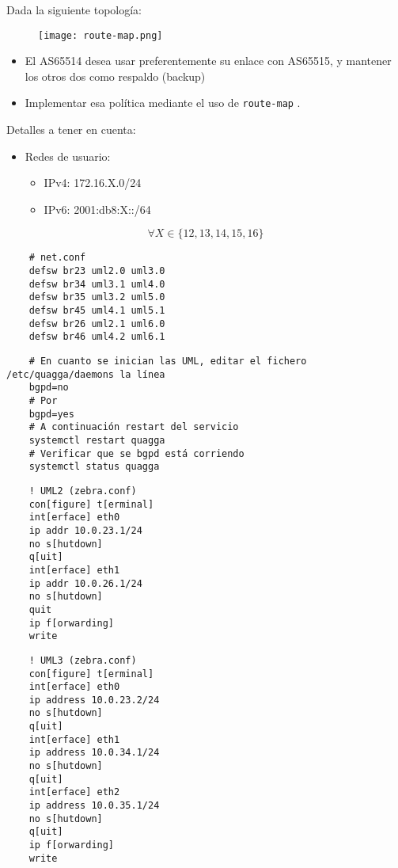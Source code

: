 Dada la siguiente topología:
  \begin{figure}[h]
    \texttt{[image: route-map.png]}
  \end{figure}

  \begin{itemize}
    \item El AS65514 desea usar preferentemente su enlace con AS65515,
    y mantener los otros dos como respaldo (backup)
    \item Implementar esa política mediante el uso de \texttt{route-map} .
  \end{itemize}

  Detalles a tener en cuenta:

  \begin{itemize}
    \item Redes de usuario:
    \begin{itemize}
      \item IPv4: 172.16.X.0/24
      \item IPv6: 2001:db8:X::/64
    \end{itemize}
  \end{itemize}

  \[ \forall X \in \{12,13,14,15,16\} \]


  \begin{verbatim}
    # net.conf
    defsw br23 uml2.0 uml3.0
    defsw br34 uml3.1 uml4.0
    defsw br35 uml3.2 uml5.0
    defsw br45 uml4.1 uml5.1
    defsw br26 uml2.1 uml6.0
    defsw br46 uml4.2 uml6.1
  \end{verbatim}

  \begin{verbatim}
    # En cuanto se inician las UML, editar el fichero /etc/quagga/daemons la línea
    bgpd=no
    # Por
    bgpd=yes
    # A continuación restart del servicio
    systemctl restart quagga
    # Verificar que se bgpd está corriendo
    systemctl status quagga
  \end{verbatim}

  \begin{verbatim}
    ! UML2 (zebra.conf)
    con[figure] t[erminal]
    int[erface] eth0
    ip addr 10.0.23.1/24
    no s[hutdown]
    q[uit]
    int[erface] eth1
    ip addr 10.0.26.1/24
    no s[hutdown]
    quit
    ip f[orwarding]
    write
  \end{verbatim}

  \begin{verbatim}
    ! UML3 (zebra.conf)
    con[figure] t[erminal]
    int[erface] eth0
    ip address 10.0.23.2/24
    no s[hutdown]
    q[uit]
    int[erface] eth1
    ip address 10.0.34.1/24
    no s[hutdown]
    q[uit]
    int[erface] eth2
    ip address 10.0.35.1/24
    no s[hutdown]
    q[uit]
    ip f[orwarding]
    write
  \end{verbatim}

